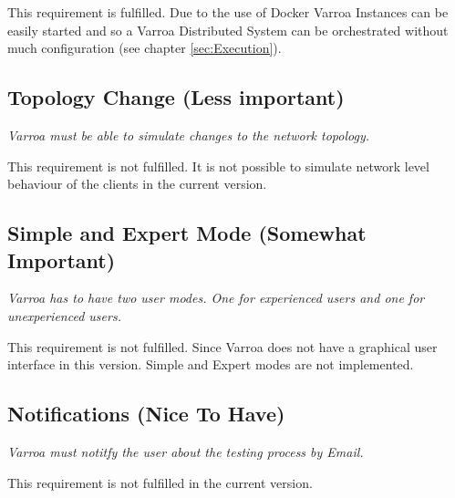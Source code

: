 This requirement is fulfilled. Due to the use of Docker Varroa Instances can be easily started and so a Varroa Distributed System can be orchestrated without much configuration (see chapter \ref{sec:Execution}).

\subsection{Topology Change (Less important)}
\emph{Varroa must be able to simulate changes to the network topology.}

This requirement is not fulfilled.
It is not possible to simulate network level behaviour of the clients in the current version.

\subsection{Simple and Expert Mode (Somewhat Important)}\vspace{-1pt}
\emph{Varroa has to have two user modes.
One for experienced users and one for unexperienced users.}

This requirement is not fulfilled.
Since Varroa does not have a graphical user interface in this version.
Simple and Expert modes are not implemented.


\subsection{Notifications (Nice To Have)}\vspace{-1pt}
\emph{Varroa must notitfy the user about the testing process by Email.}

This requirement is not fulfilled in the current version.



















